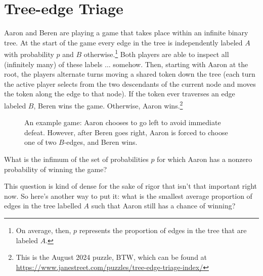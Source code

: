 \documentclass{book}
\begin{document}
\chapter{Tree-edge Triage}\label{statement}
Aaron and Beren are playing a game that takes place within an infinite binary tree. At the start of the game every edge in the tree is independently labeled $A$ with probability $p$  and $B$ otherwise.\footnote{On average, then, $p$ represents the proportion of edges in the tree that are labeled $A$.} Both players are able to inspect all (infinitely many) of these labels $\ldots$ somehow. Then, starting with Aaron at the root, the players alternate turns moving a shared token down the tree (each turn the active player selects from the two descendants of the current node and moves the token along the edge to that node). If the token ever traverses an edge labeled $B$, Beren wins the game. Otherwise, Aaron wins.\footnote{This is the August 2024 puzzle, BTW, which can be found at \url{https://www.janestreet.com/puzzles/tree-edge-triage-index/}}

\begin{figure}[ht]
\centering

\caption{An example game: Aaron chooses to go left to avoid immediate defeat. However, after Beren goes right, Aaron is forced to choose one of two $B$-edges, and Beren wins.}
\label{exGame}
\end{figure}

\begin{question}\label{infimum}
What is the infimum of the set of probabilities $p$ for which Aaron has a nonzero probability of winning the game?
\end{question}
This question is kind of dense for the sake of rigor that isn't that important right now. So here's another way to put it: what is the smallest average proportion of edges in the tree labelled $A$ such that Aaron still has a chance of winning?
\end{document}
